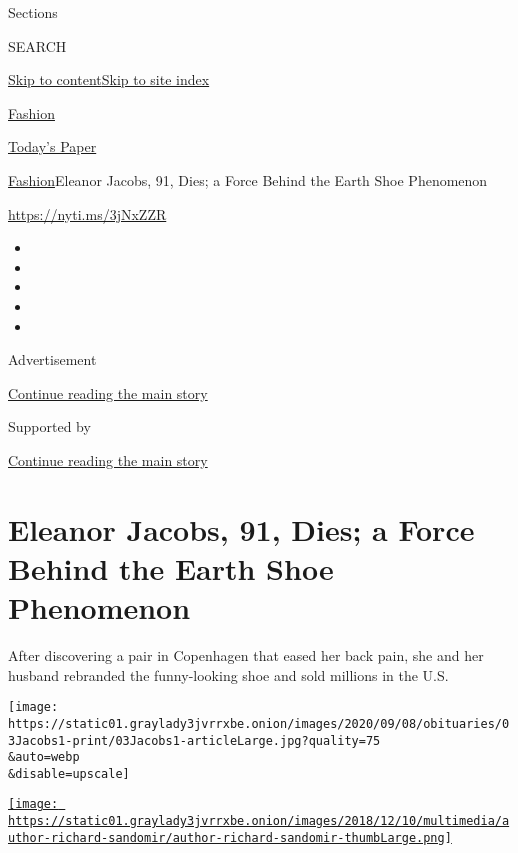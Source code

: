 Sections

SEARCH

\protect\hyperlink{site-content}{Skip to
content}\protect\hyperlink{site-index}{Skip to site index}

\href{https://www.nytimes3xbfgragh.onion/section/fashion}{Fashion}

\href{https://myaccount.nytimes3xbfgragh.onion/auth/login?response_type=cookie\&client_id=vi}{}

\href{https://www.nytimes3xbfgragh.onion/section/todayspaper}{Today's
Paper}

\href{/section/fashion}{Fashion}\textbar{}Eleanor Jacobs, 91, Dies; a
Force Behind the Earth Shoe Phenomenon

\url{https://nyti.ms/3jNxZZR}

\begin{itemize}
\item
\item
\item
\item
\item
\end{itemize}

Advertisement

\protect\hyperlink{after-top}{Continue reading the main story}

Supported by

\protect\hyperlink{after-sponsor}{Continue reading the main story}

\hypertarget{eleanor-jacobs-91-dies-a-force-behind-the-earth-shoe-phenomenon}{%
\section{Eleanor Jacobs, 91, Dies; a Force Behind the Earth Shoe
Phenomenon}\label{eleanor-jacobs-91-dies-a-force-behind-the-earth-shoe-phenomenon}}

After discovering a pair in Copenhagen that eased her back pain, she and
her husband rebranded the funny-looking shoe and sold millions in the
U.S.

\texttt{[image: https://static01.graylady3jvrrxbe.onion/images/2020/09/08/obituaries/03Jacobs1-print/03Jacobs1-articleLarge.jpg?quality=75\\\&auto=webp\\\&disable=upscale]}

\href{https://www.nytimes3xbfgragh.onion/by/richard-sandomir}{\texttt{[image: https://static01.graylady3jvrrxbe.onion/images/2018/12/10/multimedia/author-richard-sandomir/author-richard-sandomir-thumbLarge.png]}}

